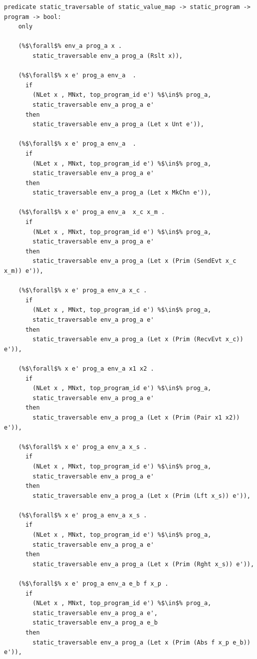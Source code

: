 \documentclass{article}
\begin{document}
\begin{lstlisting}[language=logic, escapechar=\%]
  predicate static_traversable of static_value_map -> static_program -> program -> bool:
    only
    
    (%$\forall$% env_a prog_a x .
        static_traversable env_a prog_a (Rslt x)),

    (%$\forall$% x e' prog_a env_a  .
      if
        (NLet x , MNxt, top_program_id e') %$\in$% prog_a,
        static_traversable env_a prog_a e'
      then
        static_traversable env_a prog_a (Let x Unt e')),

    (%$\forall$% x e' prog_a env_a  .
      if
        (NLet x , MNxt, top_program_id e') %$\in$% prog_a,
        static_traversable env_a prog_a e'
      then
        static_traversable env_a prog_a (Let x MkChn e')),

    (%$\forall$% x e' prog_a env_a  x_c x_m .
      if
        (NLet x , MNxt, top_program_id e') %$\in$% prog_a,
        static_traversable env_a prog_a e'
      then
        static_traversable env_a prog_a (Let x (Prim (SendEvt x_c x_m)) e')),

    (%$\forall$% x e' prog_a env_a x_c .
      if
        (NLet x , MNxt, top_program_id e') %$\in$% prog_a,
        static_traversable env_a prog_a e'
      then
        static_traversable env_a prog_a (Let x (Prim (RecvEvt x_c)) e')),

    (%$\forall$% x e' prog_a env_a x1 x2 .
      if
        (NLet x , MNxt, top_program_id e') %$\in$% prog_a,
        static_traversable env_a prog_a e'
      then
        static_traversable env_a prog_a (Let x (Prim (Pair x1 x2)) e')),

    (%$\forall$% x e' prog_a env_a x_s .
      if
        (NLet x , MNxt, top_program_id e') %$\in$% prog_a,
        static_traversable env_a prog_a e'
      then
        static_traversable env_a prog_a (Let x (Prim (Lft x_s)) e')),

    (%$\forall$% x e' prog_a env_a x_s .
      if
        (NLet x , MNxt, top_program_id e') %$\in$% prog_a,
        static_traversable env_a prog_a e'
      then
        static_traversable env_a prog_a (Let x (Prim (Rght x_s)) e')),

    (%$\forall$% x e' prog_a env_a e_b f x_p .
      if
        (NLet x , MNxt, top_program_id e') %$\in$% prog_a,
        static_traversable env_a prog_a e',
        static_traversable env_a prog_a e_b
      then
        static_traversable env_a prog_a (Let x (Prim (Abs f x_p e_b)) e')),


\end{lstlisting}
\end{document}
